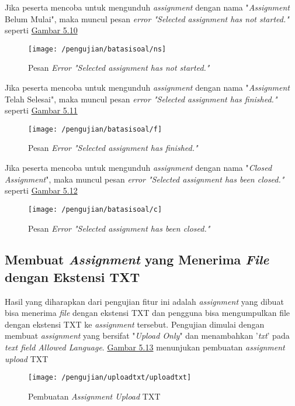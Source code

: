 	Jika peserta mencoba untuk mengunduh \textit{assignment} dengan nama "\textit{Assignment} Belum Mulai", maka muncul pesan \textit{error "Selected assignment has not started."} seperti \hyperref[fig:ns]{Gambar 5.10} 
	\begin{figure}[H]
		\centering  
		\texttt{[image: /pengujian/batasisoal/ns]}  
		\caption[Pesan \textit{Error "Selected assignment has not started."}]{Pesan \textit{Error "Selected assignment has not started."}} 
		\label{fig:ns} 
	\end{figure}

	Jika peserta mencoba untuk mengunduh \textit{assignment} dengan nama "\textit{Assignment} Telah Selesai", maka muncul pesan \textit{error "Selected assignment has finished."} seperti \hyperref[fig:f]{Gambar 5.11} 
	\begin{figure}[H]
		\centering  
		\texttt{[image: /pengujian/batasisoal/f]}  
		\caption[Pesan\textit{ Error "Selected assignment has finished."}]{Pesan \textit{Error "Selected assignment has finished."}} 
		\label{fig:f} 
	\end{figure}

	Jika peserta mencoba untuk mengunduh \textit{assignment} dengan nama "\textit{Closed Assignment}", maka muncul pesan \textit{error "Selected assignment has been closed."} seperti \hyperref[fig:c]{Gambar 5.12} 
	\begin{figure}[H]
		\centering  
		\texttt{[image: /pengujian/batasisoal/c]}  
		\caption[Pesan \textit{Error "Selected assignment has been closed."}]{Pesan \textit{Error "Selected assignment has been closed."}} 
		\label{fig:c} 
	\end{figure}

	\subsection{Membuat \textit{Assignment} yang Menerima \textit{File} dengan Ekstensi TXT}
	Hasil yang diharapkan dari pengujian fitur ini adalah \textit{assignment} yang dibuat bisa menerima \textit{file} dengan ekstensi TXT dan pengguna bisa mengumpulkan file dengan ekstensi TXT ke \textit{assignment} tersebut. Pengujian dimulai dengan membuat \textit{assignment} yang bersifat "\textit{Upload Only}" dan menambahkan '\textit{txt}' pada \textit{text field Allowed Language}.
	\hyperref[fig:uploadtxt]{Gambar 5.13} menunjukan pembuatan \textit{assignment upload} TXT
	\begin{figure}[H]
		\centering  
		\texttt{[image: /pengujian/uploadtxt/uploadtxt]}  
		\caption[Pembuatan \textit{Assignment Upload} TXT]{Pembuatan \textit{Assignment Upload} TXT} 
		\label{fig:uploadtxt} 
	\end{figure}
	
